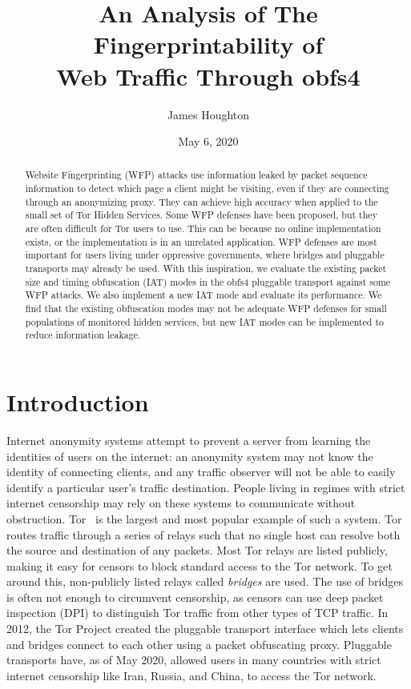 \documentclass[11pt]{article}
\title{An Analysis of The Fingerprintability of\\Web Traffic Through obfs4}
\author{James Houghton}
\affil[]{\textit{jth5zs@virginia.edu}}
\date{May 6, 2020}
\begin{document}
\maketitle

\begin{abstract}
Website Fingerprinting (WFP) attacks use information leaked by packet sequence information to detect which page a client might be visiting, even if they are connecting through an anonymizing proxy. They can achieve high accuracy when applied to the small set of Tor Hidden Services. Some WFP defenses have been proposed, but they are often difficult for Tor users to use. This can be because no online implementation exists, or the implementation is in an unrelated application. WFP defenses are most important for users living under oppressive governments, where bridges and pluggable transports may already be used. With this inspiration, we evaluate the existing packet size and timing obfuscation (IAT) modes in the obfs4 pluggable transport against some WFP attacks. We also implement a new IAT mode and evaluate its performance. We find that the existing obfuscation modes may not be adequate WFP defenses for small populations of monitored hidden services, but new IAT modes can be implemented to reduce information leakage.
\end{abstract}

\section{Introduction}
Internet anonymity systems attempt to prevent a server from learning the identities of users on the internet: an anonymity system may not know the identity of connecting clients, and any traffic observer will not be able to easily identify a particular user's traffic destination. People living in regimes with strict internet censorship may rely on these systems to communicate without obstruction. Tor~\cite{tor} is the largest and most popular example of such a system. Tor routes traffic through a series of relays such that no single host can resolve both the source and destination of any packets. Most Tor relays are listed publicly, making it easy for censors to block standard access to the Tor network. To get around this, non-publicly listed relays called \textit{bridges} are used. The use of bridges is often not enough to circumvent censorship, as censors can use deep packet inspection (DPI) to distinguish Tor traffic from other types of TCP traffic. In 2012, the Tor Project created the pluggable transport interface which lets clients and bridges connect to each other using a packet obfuscating proxy. Pluggable transports have, as of May 2020, allowed users in many countries with strict internet censorship like Iran, Russia, and China, to access the Tor network.
\end{document}
